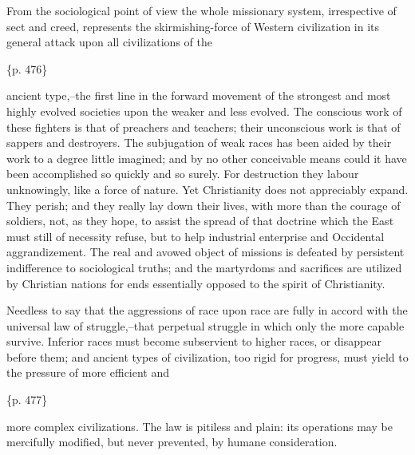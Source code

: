From the sociological point of view the whole missionary system, irrespective of sect and creed, represents the skirmishing-force of Western civilization in its general attack upon all civilizations of the

\{p. 476\}

ancient type,--the first line in the forward movement of the strongest and most highly evolved societies upon the weaker and less evolved. The conscious work of these fighters is that of preachers and teachers; their unconscious work is that of sappers and destroyers. The subjugation of weak races has been aided by their work to a degree little imagined; and by no other conceivable means could it have been accomplished so quickly and so surely. For destruction they labour unknowingly, like a force of nature. Yet Christianity does not appreciably expand. They perish; and they really lay down their lives, with more than the courage of soldiers, not, as they hope, to assist the spread of that doctrine which the East must still of necessity refuse, but to help industrial enterprise and Occidental aggrandizement. The real and avowed object of missions is defeated by persistent indifference to sociological truths; and the martyrdoms and sacrifices are utilized by Christian nations for ends essentially opposed to the spirit of Christianity.



Needless to say that the aggressions of race upon race are fully in accord with the universal law of struggle,--that perpetual struggle in which only the more capable survive. Inferior races must become subservient to higher races, or disappear before them; and ancient types of civilization, too rigid for progress, must yield to the pressure of more efficient and

\{p. 477\}

more complex civilizations. The law is pitiless and plain: its operations may be mercifully modified, but never prevented, by humane consideration.

